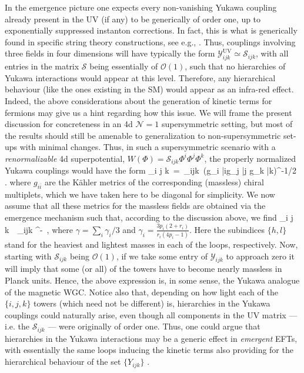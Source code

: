 In the emergence picture one expects every non-vanishing Yukawa coupling already present in the UV (if any) to be generically of order one, up to exponentially suppressed instanton corrections. In fact, this is what is generically found in specific string theory constructions, see e.g., \cite{Ibanez:2012zz}. Thus, couplings involving three fields in four dimensions will have typically the form $\mathcal{Y}^{\text{UV}}_{ijk}\simeq \mathcal{S}_{ijk}$, with all entries in the matrix $\mathcal{S}$ being essentially of $\mathcal{O}(1)$, such that no hierarchies of Yukawa interactions would appear at this level. Therefore, any hierarchical behaviour (like the ones existing in the SM) would appear as an infra-red effect. Indeed, the above considerations about the generation of kinetic terms for fermions may give us a hint regarding how this issue. We will frame the present discussion for concreteness in an 4d $\mathcal{N}=1$ supersymmetric setting, but most of the results should still be amenable to generalization to non-supersymmetric set-ups with minimal changes. Thus, in such a supersymmetric scenario with a \emph{renormalizable} 4d superpotential, $W (\Phi)= \mathcal{S}_{ijk}\Phi^i\Phi^j\Phi^k$, the properly normalized Yukawa couplings would have the form
%
\beq
	_{i j k}\, =\, _{ijk}\,  (g_{i \bar i}g_{j \bar j} g_{k \bar k})^{-1/2}\, .
\eeq
%
where $g_{i \bar i}$ are the K\"ahler metrics of the corresponding (massless) chiral multiplets, which we have taken here to be diagonal for simplicity. We now assume that all these metrics for the massless fields are obtained via the emergence mechanism such that, according to the discussion above, we find
%
\beq
	_{i j k}\,  \gtrsim \,  _{ijk} \Mpf^{-\gamma}\, ,
\eeq
%
where $\gamma =\sum_i\gamma_i/3$ and $\gamma_i=\frac{3p_i(2+r_i)}{r_i (4p_i-1)}$. Here the subindices $\{h,l\}$ stand for the heaviest and lightest masses in each of the loops, respectively. Now, starting with $\mathcal{S}_{ijk}$ being $\mathcal{O}(1)$, if we take some entry of $\mathcal{Y}_{i j k}$ to approach zero it will imply that some (or all) of the towers have to become nearly massless in Planck units. Hence, the above expression is, in some sense, the Yukawa analogue of the magnetic WGC. Notice  also that, depending on how light each of the $\{i,j,k\}$ towers (which need not be different) is, hierarchies in the Yukawa couplings could naturally arise, even though all components in the UV matrix --- i.e. the $\mathcal{S}_{ijk}$ --- were originally of order one. Thus, one could argue that hierarchies in the Yukawa interactions may be a generic effect in \emph{emergent} EFTs, with essentially the same loops inducing the kinetic terms also providing for the hierarchical behaviour of the set $\{ Y_{i j k} \}$ \cite{Castellano:2023qhp}.
	
